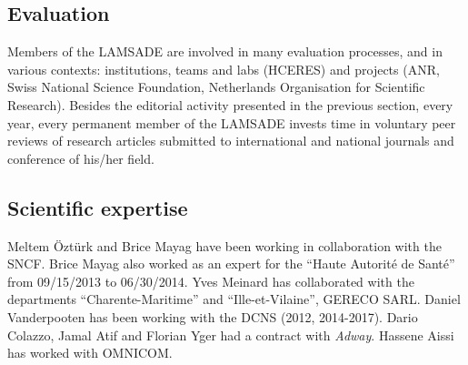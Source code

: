 \documentclass[version=last, pagesize, twoside=semi, DIV=calc, 12pt, a4paper, french, english, bibliography=totoc]{scrartcl}
\begin{document}
\subsection{Evaluation}

Members of the LAMSADE are involved in many evaluation processes, and in various contexts: 
institutions, teams and labs (HCERES) and projects (ANR, Swiss National Science Foundation, Netherlands Organisation for Scientific Research). Besides the editorial activity presented in the previous section, every year, every permanent member of the LAMSADE invests time in voluntary peer reviews of research articles submitted to international and national journals and conference of his/her field.   



\subsection{Scientific expertise}


Meltem \"Ozt\"urk and Brice Mayag have been working in collaboration with the SNCF. 
Brice Mayag also  worked as an expert for the ``Haute Autorit\'e de Sant\'e'' from 09/15/2013 to 06/30/2014. Yves Meinard has collaborated with the  departments ``Charente-Maritime'' and ``Ille-et-Vilaine'', GERECO SARL. Daniel Vanderpooten has been working with the DCNS (2012, 2014-2017). Dario Colazzo, Jamal Atif and Florian Yger had a contract with {\em Adway}. Hassene Aissi has worked with OMNICOM. 
\end{document}
